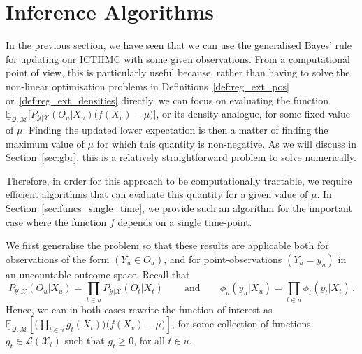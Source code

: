 \documentclass[twoside,11pt]{article}
\newcommand{\states}{\mathcal{X}}
\newcommand{\observs}{\mathcal{Y}}
\newcommand{\lexp}{\underline{\mathbb{E}}_{\rateset,\mathcal{M}}}
\newcommand{\gambles}{\mathcal{L}}
\newcommand{\rateset}{\mathcal{Q}}
\begin{document}
\section{Inference Algorithms}\label{sec:inference_algos}

In the previous section, we have seen that we can use the generalised Bayes' rule for updating our ICTHMC with some given observations. From a computational point of view, this is particularly useful because, rather than having to solve the non-linear optimisation problems %
in Definitions~\ref{def:reg_ext_pos} or~\ref{def:reg_ext_densities} directly, 
we can focus on evaluating the function $\lexp\bigl[P_{\observs\vert\states}(O_u\vert X_u)\bigl(f(X_v) - \mu\bigr)\bigr]$,
or its density-analogue, for some fixed value of $\mu$. Finding the updated lower expectation is then a matter of finding the maximum value of $\mu$ for which this quantity is non-negative. As we will discuss in Section~\ref{sec:gbr}, this is a relatively straightforward problem to solve numerically.

Therefore, in order for this approach to be computationally tractable, we require efficient algorithms that can evaluate this quantity for a given value of $\mu$. In Section~\ref{sec:funcs_single_time}, we provide such an algorithm for the important case where the function $f$ depends on a single time-point.

We first generalise the problem so that these results are applicable both for observations of the form $(Y_u\in O_u)$, and for point-observations $(Y_u=y_u)$ in an uncountable outcome space. Recall that %
\begin{equation*}
P_{\observs\vert\states}(O_u\vert X_u) = \prod_{t\in u}P_{\observs\vert\states}(O_{t}\vert X_{t})\,\quad\quad\text{and}\quad\quad \phi_u(y_u\vert X_u) = \prod_{t\in u}\phi_{t}(y_{t}\vert X_{t})\,.
\end{equation*}
Hence, we can in both cases rewrite the function of interest as
$\lexp\left[ \bigl(\prod_{t\in u}g_{t}(X_{t})\bigr)\bigl(f(X_v) - \mu\bigr) \right]$,
for some collection of functions $g_{t}\in\gambles(\states_{t})$ such that $g_{t}\geq 0$, for all $t\in u$.
\end{document}
